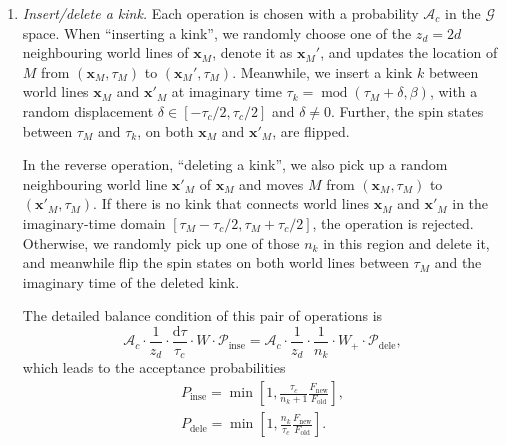 \documentclass{article}
\DeclareMathOperator{\Mod}{mod}
\theoremstyle{plain} \newtheorem{thm}{Theorem}[section]
\theoremstyle{definition} \newtheorem{df}{Definition}[section]
\theoremstyle{definition} \newtheorem{eg}{Example}
\theoremstyle{remark} \newtheorem*{rmk}{Remark}
\begin{document}
\begin{enumerate}
  \item \textit{Insert/delete a kink.}
    Each operation is chosen with a probability $\mathcal{A}_c$ in the $\mathcal{G}$ space. When ``inserting a kink'', we randomly choose one of the $z_d = 2d$ neighbouring world lines of $\bm{x}_M$, denote it as $\bm{x}_M'$, and updates the location of $M$ from $(\bm{x}_M, \tau_M)$ to $(\bm{x}_M', \tau_M)$. Meanwhile, we insert a kink $k$ between world lines ${\mathbf x}_M$ and ${\mathbf x}'_M$ at imaginary time $\tau_k = \Mod(\tau_M+\delta,\beta)$, with a random displacement $\delta \in [-\tau_c/2, \tau_c/2]$ and $\delta\neq 0$. Further, the spin states between $\tau_M$ and $\tau_k$, on both ${\mathbf x}_M$ and ${\mathbf x}'_M$, are flipped.

    In the reverse operation, ``deleting a kink'', we also pick up a random neighbouring world line ${\mathbf x}'_M$ of $\mathbf{x}_M$ and moves $M$ from $({\mathbf x}_M, \tau_M)$ to $({\mathbf x}'_M, \tau_M)$. If there is no kink that connects world lines ${\mathbf x}_M$ and ${\mathbf x}'_M$ in the imaginary-time domain $[\tau_M-\tau_c/2, \tau_M+\tau_c/2]$, the operation is rejected. Otherwise, we randomly pick up one of those  $n_k$ in this region and delete it, and meanwhile flip the spin states on both world lines between $\tau_M$ and the imaginary time of the deleted kink.

    The detailed balance condition of this pair of operations is
    \begin{equation}
      \mathcal{A}_c\cdot\frac{1}{z_d}\cdot\frac{\mathrm{d}\tau}{\tau_c}\cdot W\cdot \mathcal{P}_\text{inse} = \mathcal{A}_c\cdot\frac{1}{z_d}\cdot\frac{1}{n_k}\cdot W_+\cdot \mathcal{P}_\text{dele},
    \end{equation}
    which leads to the acceptance probabilities
    \begin{gather}
      P_\text{inse} = \min\left[1, \frac{\tau_c}{n_k+1}\frac{F_\text{new}}{F_\text{old}}\right],\\
      P_\text{dele} = \min\left[1, \frac{n_k}{\tau_c}\frac{F_\text{new}}{F_\text{old}}\right].
    \end{gather}
\end{enumerate}
\end{document}
